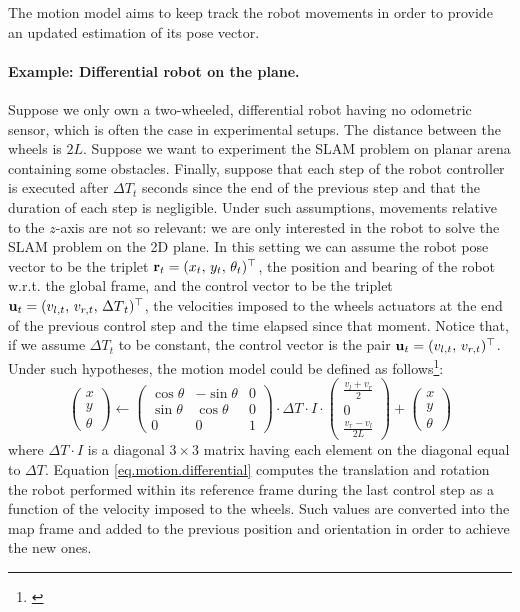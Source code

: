 	The motion model aims to keep track the robot movements in order to provide an updated estimation of its pose vector.
	
	\paragraph{Example: Differential robot on the plane.}
		Suppose we only own a two-wheeled, differential robot having no odometric sensor, which is often the case in experimental setups.
		The distance between the wheels is $2L$.
		Suppose we want to experiment the SLAM problem on planar arena containing some obstacles.
		Finally, suppose that each step of the robot controller is executed after ${\Delta T}_t$ seconds since the end of the previous step and that the duration of each step is negligible.
		Under such assumptions, movements relative to the $z$-axis are not so relevant: we are only interested in the robot to solve the SLAM problem on the 2D plane.
		In this setting we can assume the robot pose vector to be the triplet $\boldsymbol{\mathrm{{r}}}_t = (x_t,\, y_t,\, \theta_t)^\top$, \ie{} the position and bearing of the robot w.r.t. the global frame, and the control vector to be the triplet $\boldsymbol{\mathrm{{u}}}_t = (v_{l,t},\, v_{r,t},\, {\Delta T}_t)^\top$, \ie{} the velocities imposed to the wheels actuators at the end of the previous control step and the time elapsed since that moment.
		Notice that, if we assume ${\Delta T}_t$ to be constant, the control vector is the pair $\boldsymbol{\mathrm{{u}}}_t = (v_{l,t},\, v_{r,t})^\top$.
		Under such hypotheses, the motion model could be defined as follows\footnote{\label{sec.models.alert}\notationAlert}:
		\begin{equation}
			\label{eq.motion.differential}
			\left(\begin{array}{c}
				x \\ y \\ \theta
			\end{array}\right)
			\leftarrow
			\left(\begin{array}{ccc}
				\cos{\theta} & -\sin{\theta} & 0 \\
				\sin{\theta} & \cos{\theta} & 0 \\
				0 & 0 & 1
			\end{array}\right)
			\cdot {\Delta T} \cdot I \cdot
			\left(\begin{array}{c}
				\frac{v_l + v_r}{2} \\ 
				0 \\
				\frac{v_r - v_l}{2L}
			\end{array}\right)
			+
			\left(\begin{array}{c}
				x \\ y \\ \theta
			\end{array}\right)
		\end{equation}
		where ${\Delta T} \cdot I$ is a diagonal $3 \times 3$ matrix having each element on the diagonal equal to ${\Delta T}$.
		Equation \ref{eq.motion.differential} computes the translation and rotation the robot performed within its reference frame during the last control step as a function of the velocity imposed to the wheels. 
		Such values are converted into the map frame and added to the previous position and orientation in order to achieve the new ones. 
		

